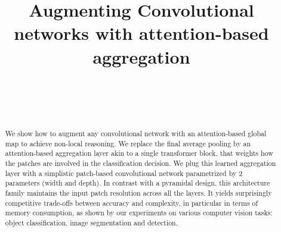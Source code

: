 \documentclass[10pt,twocolumn,letterpaper]{article}
\begin{document}
\title{Augmenting Convolutional networks with attention-based aggregation}

\author{\begin{minipage}{\linewidth}
\begin{center}
\\[0.1cm]
\\[0.2cm]
%
\\[2.0cm]
%  
\end{center}
\end{minipage}
}






\makeatletter
\let\inserttitle\@title
%
\makeatother
\maketitle


\begin{abstract} 
We show how to augment any convolutional network with an attention-based global map to achieve non-local reasoning. We replace the final average pooling by an attention-based aggregation layer akin to a single transformer block, that weights how the patches are involved in the classification decision. We plug this learned aggregation layer with a simplistic patch-based convolutional network parametrized by 2 parameters (width and depth). In contrast with a pyramidal design, this architecture family maintains the input patch resolution across all the layers. It yields surprisingly competitive trade-offs between accuracy and complexity, in particular in terms of memory consumption, as shown by our experiments on various computer vision tasks: object classification, image segmentation and detection. %
\end{abstract}














{\small


}
\clearpage

\end{document}
